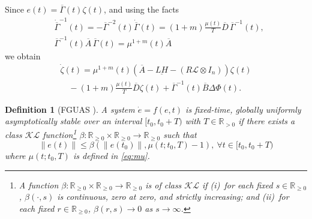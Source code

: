 \documentclass[journal]{IEEEtran}
\newtheorem{definition}{Definition}
\begin{document}
Since $e(t) = {\overline{\Gamma}}(t) \zeta(t)$, and using the facts 
\begin{align*}
    & \dot{\overline\Gamma}^{-1}(t) = -\overline{\Gamma}^{-2}(t) \dot{\overline \Gamma}(t) = (1+m)\frac{\mu(t)}{T}\overline D\, \overline \Gamma^{-1}(t), \\
    & \overline\Gamma^{-1}(t) \overline A\, \overline\Gamma(t) = \mu^{1+m}(t) \overline A
\end{align*}
we obtain
\begin{multline}
    \label{eq:transformederror}
    \dot \zeta(t) =\mu^{1+m}(t)(\overline{A}-\underline{LH}- (R\mathcal{L}\otimes I_n))\zeta(t)\\
    \quad-(1+m)\frac{ \mu(t)}{T} \overline{D}\zeta(t)+{\overline \Gamma^{-1}}(t) \overline B \Delta\Phi(t).
\end{multline}



\begin{definition}[FGUAS \cite{Holloway19}]
  \label{def:FTGAS1}
A system $\dot e = f(e,t)$ is \emph{fixed-time, globally uniformly asymptotically stable} over an interval $[t_0,t_0+T)$ with $T\in\mathbb R_{>0}$ if there exists a class $\mathcal{KL}$ function\footnote{A function $\beta:\mathbb R_{\geq 0}\times\mathbb R_{\geq 0}\to\mathbb R_{\geq 0}$ is of class $\mathcal{KL}$ if (i)~for each fixed $s\in\mathbb R_{\geq 0}$, $\beta(\cdot,s)$ is continuous, zero at zero, and strictly increasing; and (ii)~for each fixed $r\in\mathbb R_{\geq 0}$, $\beta(r,s)\to 0$ as $s\to\infty$.} $\beta:\mathbb R_{\geq 0}\times\mathbb R_{\geq 0}\to\mathbb R_{\geq 0}$ such that
\begin{equation}
    \label{eq:KL-FTGUAS}
    \| e(t) \| \leq \beta (\|e({t_0})\|,\mu(t;t_0,T)-1), ~\forall t\in [t_0,t_0+T)
\end{equation}
where $\mu(t;t_0,T)$ is defined in \eqref{eq:mu}.
\end{definition}

\end{document}
